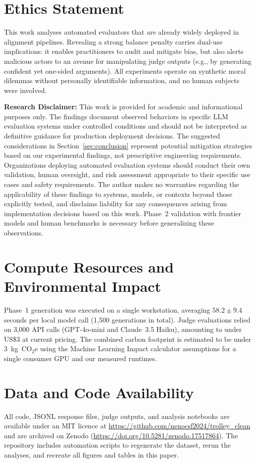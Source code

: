 \documentclass[11pt]{article}
\begin{document}
\section*{Ethics Statement}
This work analyses automated evaluators that are already widely deployed in alignment pipelines. Revealing a strong balance penalty carries dual-use implications: it enables practitioners to audit and mitigate bias, but also alerts malicious actors to an avenue for manipulating judge outputs (e.g., by generating confident yet one-sided arguments). All experiments operate on synthetic moral dilemmas without personally identifiable information, and no human subjects were involved.

\textbf{Research Disclaimer:} This work is provided for academic and informational purposes only. The findings document observed behaviors in specific LLM evaluation systems under controlled conditions and should not be interpreted as definitive guidance for production deployment decisions. The suggested considerations in Section~\ref{sec:conclusion} represent potential mitigation strategies based on our experimental findings, not prescriptive engineering requirements. Organizations deploying automated evaluation systems should conduct their own validation, human oversight, and risk assessment appropriate to their specific use cases and safety requirements. The author makes no warranties regarding the applicability of these findings to systems, models, or contexts beyond those explicitly tested, and disclaims liability for any consequences arising from implementation decisions based on this work. Phase~2 validation with frontier models and human benchmarks is necessary before generalizing these observations.

\section*{Compute Resources and Environmental Impact}
Phase~1 generation was executed on a single workstation, averaging $58.2 \pm 9.4$ seconds per local model call (1{,}500 generations in total). Judge evaluations relied on 3,000 API calls (GPT-4o-mini and Claude~3.5 Haiku), amounting to under US\$3 at current pricing. The combined carbon footprint is estimated to be under 3~kg~CO$_2$e using the Machine Learning Impact calculator assumptions for a single consumer GPU and our measured runtimes.

\section*{Data and Code Availability}
All code, JSONL response files, judge outputs, and analysis notebooks are available under an MIT licence at \url{https://github.com/nenocsf2024/trolley\_clean} and are archived on Zenodo (\url{https://doi.org/10.5281/zenodo.17517864}). The repository includes automation scripts to regenerate the dataset, rerun the analyses, and recreate all figures and tables in this paper.
\end{document}
